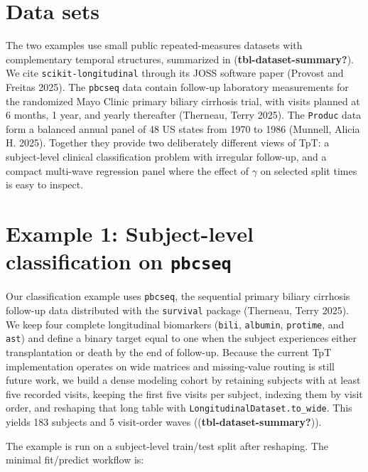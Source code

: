 \documentclass[
]{article}
\begin{document}
\section{Data sets}\label{data-sets}

The two examples use small public repeated-measures datasets with
complementary temporal structures, summarized in
(\textbf{tbl-dataset-summary?}). We cite \texttt{scikit-longitudinal}
through its JOSS software paper (Provost and Freitas 2025). The
\texttt{pbcseq} data contain follow-up laboratory measurements for the
randomized Mayo Clinic primary biliary cirrhosis trial, with visits
planned at 6 months, 1 year, and yearly thereafter (Therneau, Terry
2025). The \texttt{Produc} data form a balanced annual panel of 48 US
states from 1970 to 1986 (Munnell, Alicia H. 2025). Together they
provide two deliberately different views of TpT: a subject-level
clinical classification problem with irregular follow-up, and a compact
multi-wave regression panel where the effect of \(\gamma\) on selected
split times is easy to inspect.

\label{tbl-dataset-summary}

\section{\texorpdfstring{Example 1: Subject-level classification on
\texttt{pbcseq}}{Example 1: Subject-level classification on pbcseq}}\label{example-1-subject-level-classification-on-pbcseq}

Our classification example uses \texttt{pbcseq}, the sequential primary
biliary cirrhosis follow-up data distributed with the \texttt{survival}
package (Therneau, Terry 2025). We keep four complete longitudinal
biomarkers (\texttt{bili}, \texttt{albumin}, \texttt{protime}, and
\texttt{ast}) and define a binary target equal to one when the subject
experiences either transplantation or death by the end of follow-up.
Because the current TpT implementation operates on wide matrices and
missing-value routing is still future work, we build a dense modeling
cohort by retaining subjects with at least five recorded visits, keeping
the first five visits per subject, indexing them by visit order, and
reshaping that long table with \texttt{LongitudinalDataset.to\_wide}.
This yields 183 subjects and 5 visit-order waves
((\textbf{tbl-dataset-summary?})).

The example is run on a subject-level train/test split after reshaping.
The minimal fit/predict workflow is:
\end{document}
